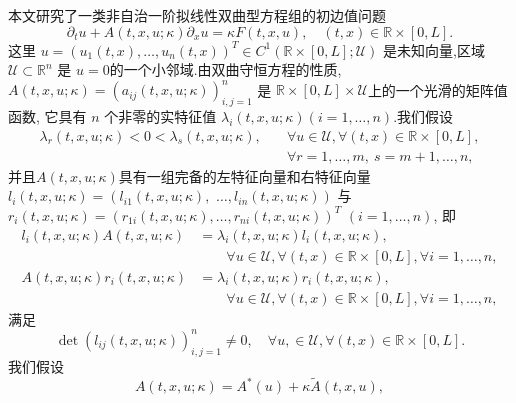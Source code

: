 \documentclass[notitlepage,cs4size,punct,oneside]{ctexrep}
\numberwithin{equation}{chapter}
\theoremstyle{mystyle}
\begin{document}
本文研究了一类非自治一阶拟线性双曲型方程组的初边值问题
\begin{equation}\label{A1}
    \partial_{t} u+A(t,x,u;\kappa) \partial_{x} u=\kappa F(t,x,u), \quad(t, x) \in \mathbb{R} \times[0, L].
\end{equation}
这里 $u=\left(u_{1}(t, x), \ldots, u_{n}(t, x)\right)^{T} \in C^{1}(\mathbb{R} \times[0, L] ; \mathcal{U})$ 是未知向量,区域 $\mathcal{U} \subset \mathbb{R}^{n}$ 是 $u=0$的一个小邻域.由双曲守恒方程的性质, $A(t,x,u;\kappa)=\left(a_{i j}(t,x,u;\kappa)\right)_{i, j=1}^{n}$  是 $\mathbb{R} \times[0, L] \times \mathcal{U}$上的一个光滑的矩阵值函数, 它具有 $n$ 个非零的实特征值 $\lambda_{i}(t,x,u;\kappa)(i=1, \ldots, n)$.我们假设
\begin{align}
    \lambda_{r}(t,x,u;\kappa) < 0 < \lambda_{s}(t,x,u;\kappa), \quad & \forall u \in \mathcal{U}, \forall (t,x) \in \mathbb{R} \times [0,L], \nonumber \\
                                                                     & \forall r=1,\ldots,m,\ s=m+1,\ldots,n ,\label{A3}
\end{align}
并且$A(t,x,u;\kappa)$具有一组完备的左特征向量和右特征向量$l_{i}(t,x,u;\kappa)=\left(l_{i 1}(t,x,u;\kappa),  \right. $ $\left.\ldots,l_{i n}(t,x,u;\kappa)\right)$ 与 $r_{i}(t,x,u;\kappa)=\left(r_{1 i}(t,x,u;\kappa), \ldots, r_{n i}(t,x,u;\kappa)\right)^{T}$ $(i=1, \ldots, n)$, 即
\begin{align}
    l_{i}(t,x,u;\kappa)A(t,x,u;\kappa) & = \lambda_{i}(t,x,u;\kappa)l_{i}(t,x,u;\kappa), \nonumber                                                      \\
                                       & \qquad \forall u \in \mathcal{U}, \forall (t,x) \in \mathbb{R} \times [0,L], \forall i=1, \ldots, n,\label{A4} \\
    A(t,x,u;\kappa)r_{i}(t,x,u;\kappa) & = \lambda_{i}(t,x,u;\kappa)r_{i}(t,x,u;\kappa), \nonumber                                                      \\
                                       & \qquad \forall u \in \mathcal{U}, \forall (t,x) \in \mathbb{R} \times [0,L], \forall i=1, \ldots, n,\label{A5}
\end{align}
满足
\begin{equation}\label{A6}
    \operatorname{det}\left(l_{i j}(t,x,u;\kappa)\right)_{i, j=1}^{n} \neq 0, \quad \forall u, \in \mathcal{U} ,\forall (t,x) \in \mathbb{R} \times [0,L].
\end{equation}
我们假设
\begin{equation}\label{A6.5}
    A(t,x,u;\kappa )=A^{*}(u) + \kappa \tilde{A}(t,x,u),
\end{equation}
\end{document}
